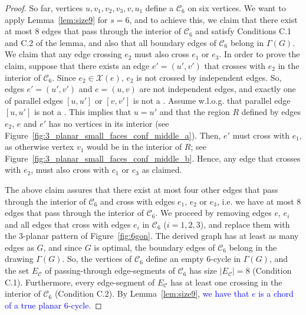 \begin{proof}
So far, vertices $u,v_1,v_2,v_3,v,u_1$ define a \pp $\mathcal{C}_6$ on six vertices. We want to apply Lemma~\ref{lem:size9} for $s=6$, and to achieve this, we claim that there exist at most $8$ edges that pass through the interior of $\mathcal{C}_6$ and satisfy Conditions C.1 and C.2 of the lemma, and also that all boundary edges of $\mathcal{C}_6$ belong in $\Gamma(G)$. We claim that any edge crossing $e_2$ must also cross $e_1$ or $e_3$. In order to prove the claim, suppose that there exists an edge $e'=(u',v')$ that crosses with $e_2$ in the interior of $\mathcal{C}_6$. Since $e_2\in \mathcal{X}(e)$, $e_2$ is not crossed by independent edges. So, edges $e'=(u',v')$ and $e=(u,v)$ are not independent edges, and exactly one of parallel edges $[u,u']$ or $[v,v']$ is not a \pe. Assume w.l.o.g. that parallel edge $[u,u']$ is not a \pe. This implies that $u=u'$ and that the region $R$ defined by edges $e_2$, $e$ and $e'$ has no vertices in its interior (see Figure~\ref{fig:3_planar_small_faces_conf_middle_a}). Then, $e'$ must cross with $e_1$, as otherwise vertex $v_1$ would be in the interior of $R$; see Figure~\ref{fig:3_planar_small_faces_conf_middle_b}. Hence, any edge that crosses with $e_2$, must also cross with $e_1$ or $e_3$ as claimed. 

The above claim assures that there exist at most four other edges that pass through the interior of $\mathcal{C}_6$ and cross with edges $e_1$, $e_2$ or $e_3$, i.e. we have at most $8$ edges that pass through the interior of $\mathcal{C}_6$. We proceed by removing edges $e$, $e_i$ and all edges that cross with edges $e_i$ in  $\mathcal{C}_6$ ($i=1,2,3$), and replace them with the $3$-planar pattern of Figure~\ref{fig:6gon}. The derived graph has at least as many edges as $G$, and since $G$ is optimal, the boundary edges of $\mathcal{C}_6$ belong in the drawing $\Gamma(G)$. So, the vertices of $\mathcal{C}_6$ define an empty $6$-cycle in $\Gamma(G)$, and the set $E_{\mathcal{C}}$ of passing-through edge-segments of $\mathcal{C}_6$ has size $|E_{\mathcal{C}}|=8$ (Condition C.1). Furthermore, every edge-segment of $E_{\mathcal{C}}$ has at least one crossing in the interior of $\mathcal{C}_6$ (Condition C.2). By Lemma~\ref{lem:size9}, %
\textcolor{blue}{we have that $e$ is a chord of a true planar $6$-cycle.}
\end{proof}

